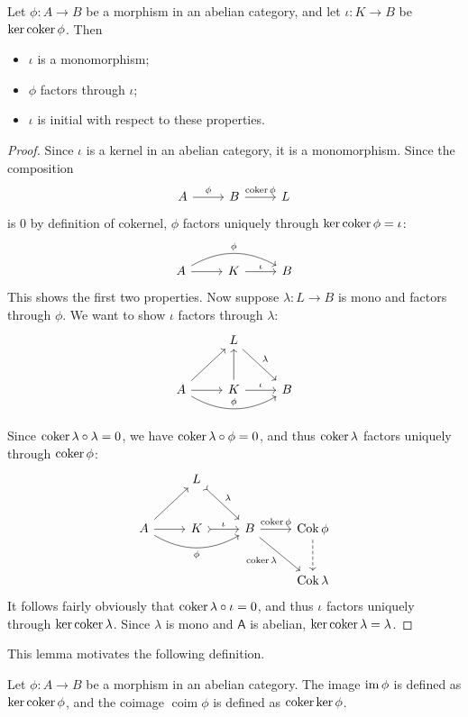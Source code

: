 \begin{lemma}\label{lma:9.6}
	Let $\phi : A \to B$ be a morphism in an abelian category, and let $\iota  : K \to B$ be $\ker \operatorname{coker} \phi $. Then
	\begin{itemize}
		\item $\iota $ is a monomorphism;
		\item $\phi $ factors through $\iota $;
		\item $\iota $ is initial with respect to these properties.
	\end{itemize}
\end{lemma}
\begin{proof}
	Since $\iota $ is a kernel in an abelian category, it is a monomorphism. Since the composition
	\[\begin{tikzcd}[row sep = 2.5em, column sep = 2.5em]
		A\arrow[r, "\phi "]&B\arrow[r, "\coker \phi "]&L
	\end{tikzcd}\]
	is $0$ by definition of cokernel, $\phi $ factors uniquely through $\ker \operatorname{coker} \phi =\iota $:
	\[\begin{tikzcd}[row sep = 2.5em, column sep = 2.5em]
		A\arrow[r]\arrow[rr, bend left, "\phi "]&K\arrow[r, "\iota "]&B
	\end{tikzcd}\]
	This shows the first two properties. Now suppose $\lambda : L \to B$ is mono and factors through $\phi $. We want to show $\iota $ factors through $\lambda $:
	\[\begin{tikzcd}[row sep = 2.5em, column sep = 2.5em]
		&L\arrow[dr, "\lambda "]\\
		A\arrow[ur]\arrow[rr, bend right, "\phi "]\arrow[r]&K\arrow[u]\arrow[r, "\iota "]&B
	\end{tikzcd}\]
	
	Since $\operatorname{coker} \lambda \circ \lambda =0$, we have $\operatorname{coker} \lambda \circ \phi =0$, and thus $\operatorname{coker} \lambda $ factors uniquely through $\operatorname{coker} \phi $:
	\[\begin{tikzcd}[row sep = 2.5em, column sep = 2.5em]
		&L\arrow[dr, tail, "\lambda "]\\
		A\arrow[ur]\arrow[r]\arrow[rr, bend right, "\phi "']&K\arrow[r, tail, "\iota "]&B\arrow[r, "\coker \phi  "]\arrow[dr, "\coker \lambda "']&\operatorname{Cok} \phi\arrow[d, dashed] \\
								   &&&\operatorname{Cok} \lambda 
	\end{tikzcd}\]
	It follows fairly obviously that $\operatorname{coker} \lambda  \circ \iota =0$, and thus $\iota $ factors uniquely through $\ker \operatorname{coker} \lambda $. Since $\lambda $ is mono and $\mathsf{A} $ is abelian, $\ker \operatorname{coker} \lambda =\lambda $.
\end{proof}
This lemma motivates the following definition.
\begin{definition}\label{dfn:9.5}
	Let $\phi : A \to B$ be a morphism in an abelian category. The image $\operatorname{im} \phi $ is defined as $\ker \operatorname{coker} \phi $, and the coimage $\operatorname{coim} \phi $ is defined as $\operatorname{coker} \ker \phi $.
\end{definition}

